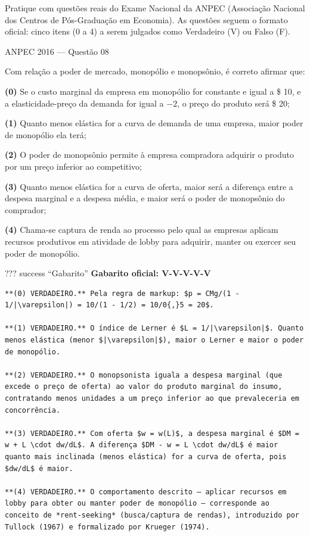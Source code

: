 \documentclass[11pt,twoside,openright]{book}
\begin{document}
Pratique com questões reais do Exame Nacional da ANPEC (Associação
Nacional dos Centros de Pós-Graduação em Economia). As questões seguem o
formato oficial: cinco itens (0 a 4) a serem julgados como Verdadeiro
(V) ou Falso (F).

\begin{infobox}{ANPEC 2016 — Questão 08}

Com relação a poder de mercado, monopólio e monopsônio, é correto
afirmar que:

\textbf{(0)} Se o custo marginal da empresa em monopólio for constante e
igual a \$ 10, e a elasticidade-preço da demanda for igual a \(-2\), o
preço do produto será \$ 20;

\textbf{(1)} Quanto menos elástica for a curva de demanda de uma
empresa, maior poder de monopólio ela terá;

\textbf{(2)} O poder de monopsônio permite à empresa compradora adquirir
o produto por um preço inferior ao competitivo;

\textbf{(3)} Quanto menos elástica for a curva de oferta, maior será a
diferença entre a despesa marginal e a despesa média, e maior será o
poder de monopsônio do comprador;

\textbf{(4)} Chama-se captura de renda ao processo pelo qual as empresas
aplicam recursos produtivos em atividade de lobby para adquirir, manter
ou exercer seu poder de monopólio.

??? success ``Gabarito'' \textbf{Gabarito oficial: V-V-V-V-V}

\begin{verbatim}
**(0) VERDADEIRO.** Pela regra de markup: $p = CMg/(1 - 1/|\varepsilon|) = 10/(1 - 1/2) = 10/0{,}5 = 20$.

**(1) VERDADEIRO.** O índice de Lerner é $L = 1/|\varepsilon|$. Quanto menos elástica (menor $|\varepsilon|$), maior o Lerner e maior o poder de monopólio.

**(2) VERDADEIRO.** O monopsonista iguala a despesa marginal (que excede o preço de oferta) ao valor do produto marginal do insumo, contratando menos unidades a um preço inferior ao que prevaleceria em concorrência.

**(3) VERDADEIRO.** Com oferta $w = w(L)$, a despesa marginal é $DM = w + L \cdot dw/dL$. A diferença $DM - w = L \cdot dw/dL$ é maior quanto mais inclinada (menos elástica) for a curva de oferta, pois $dw/dL$ é maior.

**(4) VERDADEIRO.** O comportamento descrito — aplicar recursos em lobby para obter ou manter poder de monopólio — corresponde ao conceito de *rent-seeking* (busca/captura de rendas), introduzido por Tullock (1967) e formalizado por Krueger (1974).
\end{verbatim}

\end{infobox}
\end{document}
